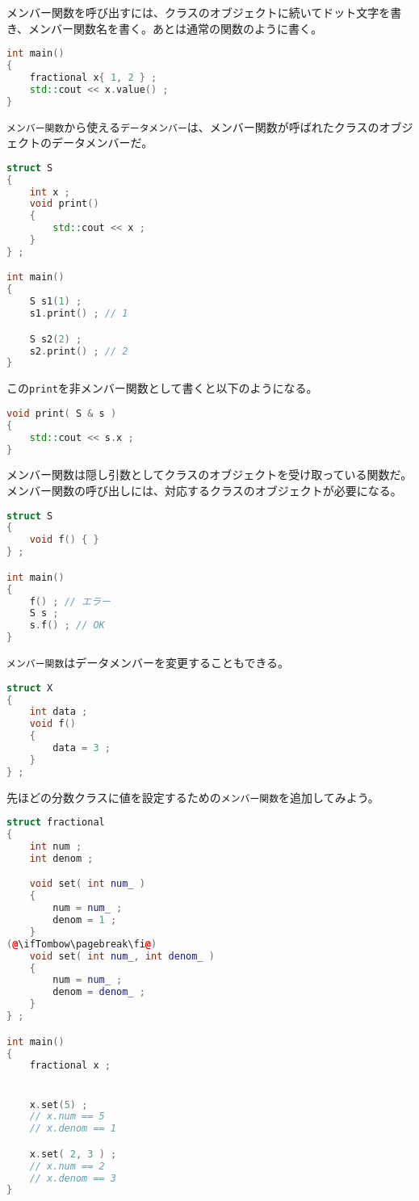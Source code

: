 メンバー関数を呼び出すには、クラスのオブジェクトに続いてドット文字を書き、メンバー関数名を書く。あとは通常の関数のように書く。

\begin{lstlisting}[language={C++}]
int main()
{
    fractional x{ 1, 2 } ;
    std::cout << x.value() ;
}
\end{lstlisting}

\texttt{メンバー関数}から使える\texttt{データメンバー}は、メンバー関数が呼ばれたクラスのオブジェクトのデータメンバーだ。

\begin{lstlisting}[language={C++}]
struct S
{
    int x ;
    void print()
    {
        std::cout << x ;
    }
} ;

int main()
{
    S s1(1) ;
    s1.print() ; // 1

    S s2(2) ;
    s2.print() ; // 2
}
\end{lstlisting}

\ifTombow\pagebreak\fi
この\texttt{print}を非メンバー関数として書くと以下のようになる。

\begin{lstlisting}[language={C++}]
void print( S & s )
{
    std::cout << s.x ;
}
\end{lstlisting}

メンバー関数は隠し引数としてクラスのオブジェクトを受け取っている関数だ。メンバー関数の呼び出しには、対応するクラスのオブジェクトが必要になる。

\begin{lstlisting}[language={C++}]
struct S
{
    void f() { }
} ;

int main()
{
    f() ; // エラー
    S s ;
    s.f() ; // OK
}
\end{lstlisting}

\texttt{メンバー関数}はデータメンバーを変更することもできる。

\begin{lstlisting}[language={C++}]
struct X
{
    int data ;
    void f()
    {
        data = 3 ;
    }
} ;
\end{lstlisting}

先ほどの分数クラスに値を設定するための\texttt{メンバー関数}を追加してみよう。

\begin{lstlisting}[language={C++}]
struct fractional
{
    int num ;
    int denom ;

    void set( int num_ )
    {
        num = num_ ;
        denom = 1 ;
    }
(@\ifTombow\pagebreak\fi@)
    void set( int num_, int denom_ )
    {
        num = num_ ;
        denom = denom_ ;
    }
} ;

int main()
{
    fractional x ;


    x.set(5) ;
    // x.num == 5
    // x.denom == 1

    x.set( 2, 3 ) ;
    // x.num == 2
    // x.denom == 3
}
\end{lstlisting}

